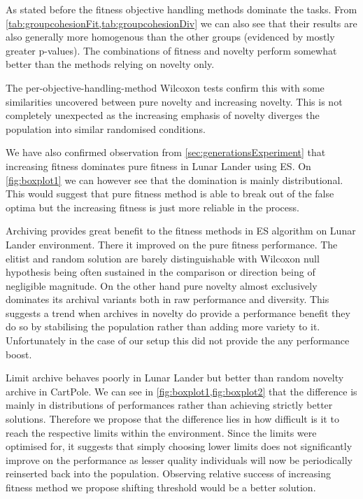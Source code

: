 As stated before the fitness objective handling methods dominate the tasks. From \cref{tab:groupcohesionFit,tab:groupcohesionDiv} we can also see that their results are also generally more homogenous than the other groups (evidenced by mostly greater p-values). The combinations of fitness and novelty perform somewhat better than the methods relying on novelty only. 

The per-objective-handling-method Wilcoxon tests confirm this with some similarities uncovered between pure novelty and increasing novelty. This is not completely unexpected as the increasing emphasis of novelty diverges the population into similar randomised conditions. 

We have also confirmed observation from \cref{sec:generationsExperiment} that increasing fitness dominates pure fitness in Lunar Lander using ES. On \cref{fig:boxplot1} we can however see that the domination is mainly distributional. This would suggest that pure fitness method is able to break out of the false optima but the increasing  fitness is just more reliable in the process.
 
 Archiving provides great benefit to the fitness methods in ES algorithm on Lunar Lander environment. There it improved on the pure fitness performance. The elitist and random solution are barely distinguishable with Wilcoxon null hypothesis being often sustained in the comparison or direction being of negligible magnitude. On the other hand pure novelty almost exclusively dominates its archival variants both in raw performance and diversity. This suggests a trend when archives in novelty do provide a performance benefit they do so by stabilising the population rather than adding more variety to it. Unfortunately in the case of our setup this did not provide the any performance boost.
 
 Limit archive behaves poorly in Lunar Lander but better than random novelty archive in CartPole. We can see in \cref{fig:boxplot1,fig:boxplot2} that the difference is mainly in distributions of performances rather than achieving strictly better solutions. Therefore we propose that the difference lies in how difficult is it to reach the respective limits within the environment. Since the limits were optimised for, it suggests that simply choosing lower limits does not significantly improve on the performance as lesser quality individuals will now be periodically reinserted back into the population. Observing relative success of increasing fitness method we propose shifting threshold would be a better solution. 


